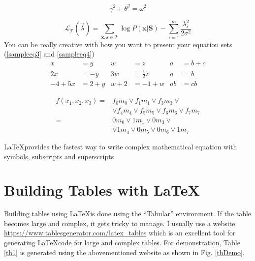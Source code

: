 \documentclass[a4paper, 12pt, one column]{article}
\begin{document}
   \begin{equation} 
   \gamma^2+\theta^2=\omega^2
   \label{sampleeq1}
   \end{equation}

   \begin{equation} 
    \mathcal{L}_{\mathcal{T}}(\vec{\lambda}) = \sum_{\mathbf{x},\mathbf{s}\in\mathcal{T}} \log P(\mathbf{x}|\mathbf{S}) - \sum_{i=1}^m \frac{\lambda_i^2}{2\sigma^2}
    \label{sampleeq2}
  \end{equation}
You can be really creative with how you want to present your equation sets (\ref{sampleeq3} and \ref{sampleeq4})
  \begin{align} 
    \label{sampleeq3}
    x&=y           &  w &=z              &  a&=b+c \nonumber \\
    2x&=-y         &  3w&=\frac{1}{2}z   &  a&=b\\
    -4 + 5x&=2+y   &  w+2&=-1+w          &  ab&=cb \nonumber
    \end{align}

    \begin{align}
        \label{sampleeq4}
        f(x_1, x_2, x_3) = & f_0 m_0 \vee f_1 m_1 \vee f_3 m_3 \vee \nonumber \\
          & \vee f_4 m_4 \vee f_5 m_5 \vee f_6 m_6 \vee f_7 m_7 \nonumber \\
        = & 0 m_0 \vee 1 m_1 \vee 0 m_3 \vee \\
          & \vee 1 m_4 \vee 0 m_5 \vee 0 m_6 \vee 1 m_7 \nonumber 
    \end{align}

    \vspace{0.3cm}

     {
            {
            \begin{minipage}{0.9\textwidth}
                \centering
            \LaTeX \space provides the fastest way to write complex mathematical equation with symbols, subscripts and superscripts
            \end{minipage}
            }
        }

\section{Building Tables with \LaTeX}

Building tables using \LaTeX is done using the ``Tabular'' environment.  If the table becomes large and complex, it gets tricky to manage. I usually use a website: \url{https://www.tablesgenerator.com/latex_tables} which is an excellent tool for generating \LaTeX \space code for large and complex tables. For demonstration, Table \ref{tb1} is generated using the abovementioned website as shown in Fig. \ref{tbDemo}. 
\end{document}

